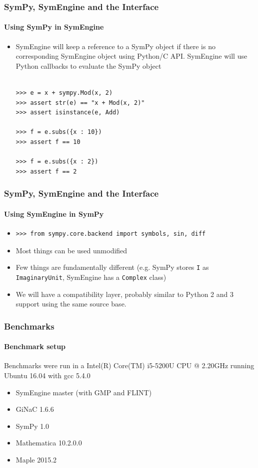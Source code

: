 \documentclass{beamer}
\begin{document}
\begin{frame}[fragile]
\frametitle{SymPy, SymEngine and the Interface}
\framesubtitle{Using SymPy in SymEngine}
\begin{itemize}
\item
SymEngine will keep a reference to a SymPy object if there is no corresponding SymEngine object using Python/C API.
SymEngine will use Python callbacks to evaluate the SymPy object

\begin{verbatim}

>>> e = x + sympy.Mod(x, 2)
>>> assert str(e) == "x + Mod(x, 2)"
>>> assert isinstance(e, Add)

>>> f = e.subs({x : 10})
>>> assert f == 10

>>> f = e.subs({x : 2})
>>> assert f == 2
\end{verbatim}
\end{itemize}
\end{frame}


\begin{frame}[fragile]
\frametitle{SymPy, SymEngine and the Interface}
\framesubtitle{Using SymEngine in SymPy}
\begin{itemize}
\item
\begin{verbatim}
>>> from sympy.core.backend import symbols, sin, diff
\end{verbatim}
\item Most things can be used unmodified
\item Few things are fundamentally different (e.g. SymPy stores \texttt{I} as
    \texttt{ImaginaryUnit}, SymEngine has a \texttt{Complex} class)
\item We will have a compatibility layer, probably similar to Python 2 and 3
    support using the same source base.
\end{itemize}
\end{frame}




\begin{frame}
\frametitle{Benchmarks}
\framesubtitle{Benchmark setup}
Benchmarks were run in a Intel(R) Core(TM) i5-5200U CPU @ 2.20GHz running Ubuntu 16.04 with gcc 5.4.0
\begin{itemize}
 \item SymEngine master (with GMP and FLINT)
 \item GiNaC 1.6.6
 \item SymPy 1.0
 \item Mathematica 10.2.0.0
 \item Maple 2015.2
\end{itemize}
\end{frame}
\end{document}
